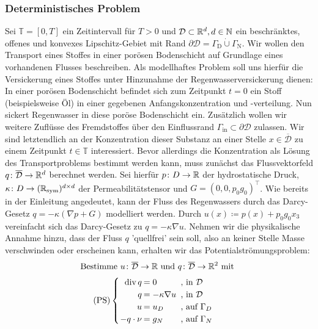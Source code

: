 \subsubsection{Deterministisches Problem}
\label{det_prob}
Sei $\mathbb{T} = [0,T]$ ein Zeitintervall für $T>0$ und $\mathcal{D} \subset \mathbb{R}^d , d \in \mathbb{N}$ ein beschränktes, offenes und konvexes Lipschitz-Gebiet mit Rand $ \partial \mathcal{D} = \Gamma_{\text{D}}  \dot{\cup} \Gamma_{\text{N}} $. 
Wir wollen den Transport eines Stoffes in einer porösen Bodenschicht auf Grundlage eines vorhandenen Flusses beschreiben. 
Als modellhaftes Problem soll uns hierfür die Versickerung eines Stoffes unter Hinzunahme der Regenwasserversickerung dienen: In einer porösen Bodenschicht befindet sich zum Zeitpunkt $t=0$ ein Stoff (beispielsweise Öl) in einer gegebenen Anfangskonzentration und -verteilung. Nun sickert Regenwasser in diese poröse Bodenschicht ein. Zusätzlich wollen wir weitere Zuflüsse des Fremdstoffes über den Einflussrand $\Gamma_{\text{in}} \subset \partial \mathcal{D}$ zulassen.
Wir sind letztendlich an der Konzentration dieser Substanz an einer Stelle $x \in \overline{\mathcal{D}}$ zu einem Zeitpunkt $t \in \mathbb{T}$ interessiert. \newline
Bevor allerdings die Konzentration als Lösung des Transportproblems bestimmt werden kann, muss zunächst das Flussvektorfeld $q \colon \overline{\mathcal{D}} \rightarrow \mathbb{R}^d$ berechnet werden. \newline
Sei hierfür $p \colon D \rightarrow \mathbb{R}$ der hydrostatische Druck, $\kappa \colon D \rightarrow (\mathbb{R}_{\text{sym}})^{d \times d}$ der Permeabilitätstensor und $G=(0,0,p_0 g_0)^{\top}$. 
Wie bereits in der Einleitung angedeutet, kann der Fluss des Regenwassers durch das Darcy-Gesetz $q=-\kappa(\nabla p + G)$ modelliert werden.
Durch $u(x) \coloneqq p(x) + p_0 g_0 x_3$ vereinfacht sich das Darcy-Gesetz zu $q=-\kappa \nabla u$.\newline
Nehmen wir die physikalische Annahme hinzu, dass der Fluss $q$ 'quellfrei' sein soll, also an keiner Stelle Masse verschwinden oder erscheinen kann, erhalten wir das Potentialströmungsproblem:
\[ \text{Bestimme } u\colon \overline{\mathcal{D}} \to \R \text{ und } q\colon \overline{\mathcal{D}} \to \R^2 \text{ mit } \newline \]
\[\setlength\arraycolsep{1pt}
\text{(PS)}\begin{cases} 
\begin{array}{rll}
\dive q     &= 0                 &\text{ , } \text{in } \mathcal{D}\\
q           &= - \kappa \nabla u &\text{ , } \text{in }\mathcal{D}\\
u           &= u_D               &\text{ , } \text{auf } \Gamma_D \\
-q \cdot \nu  &= g_N               &\text{ , } \text{auf } \Gamma_N 
\end{array}
\end{cases} \\
\]
